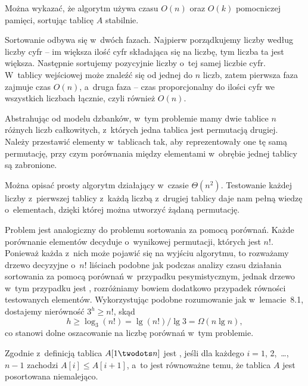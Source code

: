 Można wykazać, że algorytm używa czasu $O(n)$ oraz $O(k)$ pomocniczej pamięci, sortując tablicę $A$ stabilnie.


\subproblem %
Sortowanie odbywa się w~dwóch fazach. Najpierw porządkujemy liczby według liczby cyfr -- im większa ilość cyfr składająca się na liczbę, tym liczba ta jest większa. Następnie sortujemy pozycyjnie liczby o~tej samej liczbie cyfr. W~tablicy wejściowej może znaleźć się od jednej do $n$ liczb, zatem pierwsza faza zajmuje czas $O(n)$, a~druga faza -- czas proporcjonalny do ilości cyfr we wszystkich liczbach łącznie, czyli również $O(n)$.

\subproblem %


\subproblem %
Abstrahując od modelu dzbanków, w~tym problemie mamy dwie tablice $n$ różnych liczb całkowitych, z~których jedna tablica jest permutacją drugiej. Należy przestawić elementy w~tablicach tak, aby reprezentowały one tę samą permutację, przy czym porównania między elementami w~obrębie jednej tablicy są zabronione.

Można opisać prosty algorytm działający w~czasie $\Theta(n^2)$. Testowanie każdej liczby z~pierwszej tablicy z~każdą liczbą z~drugiej tablicy daje nam pełną wiedzę o~elementach, dzięki której można utworzyć żądaną permutację.

\subproblem %
Problem jest analogiczny do problemu sortowania za pomocą porównań. Każde porównanie elementów decyduje o~wynikowej permutacji, których jest $n!$. Ponieważ każda z~nich może pojawić się na wyjściu algorytmu, to rozważamy drzewo decyzyjne o~$n!$ liściach podobne jak podczas analizy czasu działania sortowania za pomocą porównań w~przypadku pesymistycznym, jednak drzewo w~tym przypadku jest , rozróżniamy bowiem dodatkowo przypadek równości testowanych elementów. Wykorzystując podobne rozumowanie jak w~lemacie~8.1, dostajemy nierówność $3^h\ge n!$, skąd
\[
	h \ge \log_3(n!) = \lg(n!)/\!\lg3 = \Omega(n\lg n),
\]
co stanowi dolne oszacowanie na liczbę porównań w~tym problemie.

\subproblem %


\subproblem %
Zgodnie z~definicją tablica $A[1\twodots n]$ jest , jeśli dla każdego $i=1$, 2,~\dots,~$n-1$ zachodzi $A[i]\le A[i+1]$, a~to jest równoważne temu, że tablica $A$ jest posortowana niemalejąco.

